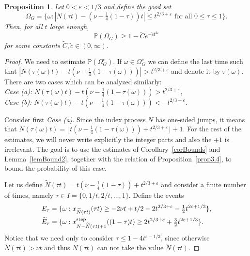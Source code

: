 \documentclass[12pt,a4paper]{article}
\numberwithin{equation}{section}
\newcommand{\Pb}{\mathbb{P}}
\newcommand{\e}{\varepsilon}
\newtheorem{prop}{Proposition}[section]
\begin{document}
\begin{prop}\label{PropGoodSet}
Let $0<\e<1/3$ and define the good set
\begin{equation}
\Omega_G=\{\omega: |N(\tau t)-(\nu-\tfrac14(1-\tau))t|\leq t^{2/3+\e}\textrm{ for all }0\leq \tau\leq 1\}.
\end{equation}
Then, for all $t$ large enough,
\begin{equation}
\Pb(\Omega_G)\geq 1- \tilde C e^{-\tilde c t^{2\e}}
\end{equation}
for some constants $\tilde C,\tilde c\in (0,\infty)$.
\end{prop}
\begin{proof}
We need to estimate $\Pb(\Omega_G^c)$. If $\omega\in \Omega_G^c$ we can define the last time such that $|N(\tau(\omega)t)-t(\nu-\tfrac14(1-\tau(\omega)))|>t^{2/3+\e}$ and denote it by $\tau(\omega)$. There are two cases which can be analyzed similarly:\\[0.5em]
\emph{Case (a):} $N(\tau(\omega)t)-t(\nu-\tfrac14(1-\tau(\omega)))>t^{2/3+\e}$,\\[0.5em]
\emph{Case (b):} $N(\tau(\omega)t)-t(\nu-\tfrac14(1-\tau(\omega)))<-t^{2/3+\e}$.

\medskip
Consider first \emph{Case (a)}. Since the index process $N$ has one-sided jumps, it means that
$N(\tau(\omega)t)=\lfloor t(\nu-\tfrac14(1-\tau(\omega)))+t^{2/3+\e}\rfloor +1$. For the rest of the estimates, we will never write explicitly the integer parts and also the $+1$ is irrelevant. The goal is to use the estimates of Corollary~\ref{corBounds} and Lemma~\ref{lemBound2}, together with the relation of Proposition~\ref{prop3.4}, to bound the probability of this case.

Let us define $\widetilde N(\tau t)=t(\nu-\tfrac14(1-\tau))+t^{2/3+\e}$ and consider a finite number of times, namely $\tau \in I=\{0,1/t,2/t,\ldots,1\}$. Define the events
\begin{equation}
\begin{aligned}
E_{\tau}&=\{\omega: x_{\widetilde N(\tau t)}(\tau t)\geq -2\nu t+t/2-2 t^{2/3+\e}-\tfrac12 t^{2\e+1/3}\},\\
\widetilde E_{\tau}&=\{\omega: x^{\rm step}_{N-\widetilde N(\tau t)+1}((1-\tau) t)\geq 2 t^{2/3+\e} + \tfrac32 t^{2\e+1/3}\}.
\end{aligned}
\end{equation}
Notice that we need only to consider $\tau\leq 1-4 t^{\e-1/3}$, since otherwise $\widetilde N(\tau t)>\nu t$ and thus $N(\tau t)$ can not take the value $\widetilde N(\tau t)$.


\end{proof}
\end{document}
